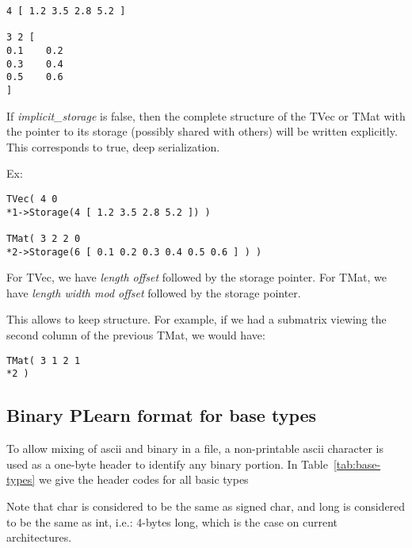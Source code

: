 \documentclass[11pt]{book}
\begin{document}
\begin{verbatim}
4 [ 1.2 3.5 2.8 5.2 ]

3 2 [
0.1    0.2
0.3    0.4
0.5    0.6
]
\end{verbatim}

If {\em implicit\_storage} is false, then the complete structure of the
TVec or TMat with the pointer to its storage (possibly shared with others)
will be written explicitly. This corresponds to true, deep serialization.

Ex:

\begin{verbatim}
TVec( 4 0 
*1->Storage(4 [ 1.2 3.5 2.8 5.2 ]) )

TMat( 3 2 2 0 
*2->Storage(6 [ 0.1 0.2 0.3 0.4 0.5 0.6 ] ) )
\end{verbatim}

For TVec, we have {\em length offset} followed by the storage pointer.
For TMat, we have {\em length width mod offset} followed by the storage pointer.

This allows to keep structure. For example, if we had a submatrix viewing
the second column of the previous TMat, we would have:

\begin{verbatim}
TMat( 3 1 2 1
*2 )
\end{verbatim}

\subsection{Binary PLearn format for base types}

To allow mixing of ascii and binary in a file, a non-printable ascii
character is used as a one-byte header to identify any binary portion.  In
Table~\ref{tab:base-types} we give the header codes for all basic types

Note that char is considered to be the same as signed char, and long is
considered to be the same as int, i.e.: 4-bytes long, which is the case on
current architectures.
\end{document}
